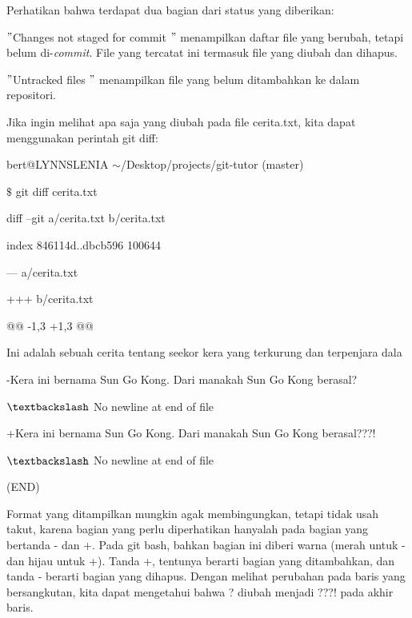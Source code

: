\vspace{12pt}
\noindent 
Perhatikan bahwa terdapat dua bagian dari status yang diberikan: \par
\noindent 
$ " $Changes not staged for commit $ " $ menampilkan daftar file yang berubah, tetapi belum di-\textit{commit}. File yang tercatat ini termasuk file yang diubah dan dihapus. \par
\noindent 
$ " $Untracked files $ " $ menampilkan file yang belum ditambahkan ke dalam repositori.
 \par
\noindent 
Jika ingin melihat apa saja yang diubah pada file {\fontsize{10pt}{10pt}\selectfont cerita.txt, kita dapat menggunakan perintah git diff:} \par
\noindent 
{\fontsize{10pt}{10pt}\selectfont bert@LYNNSLENIA  $  \sim  $/Desktop/projects/git-tutor (master)} \par
\noindent 
{\fontsize{10pt}{10pt}\selectfont  $  \$  $ git diff cerita.txt} \par
\noindent 
{\fontsize{10pt}{10pt}\selectfont diff --git a/cerita.txt b/cerita.txt} \par
\noindent 
{\fontsize{10pt}{10pt}\selectfont index 846114d..dbcb596 100644} \par
\noindent 
{\fontsize{10pt}{10pt}\selectfont --- a/cerita.txt} \par
\noindent 
{\fontsize{10pt}{10pt}\selectfont +++ b/cerita.txt} \par
\noindent 
{\fontsize{10pt}{10pt}\selectfont @@ -1,3 +1,3 @@} \par
\noindent 
{\fontsize{10pt}{10pt}\selectfont  Ini adalah sebuah cerita tentang seekor kera yang terkurung dan terpenjara dala} \par
\noindent 
\vspace{10pt}
\noindent 
{\fontsize{10pt}{10pt}\selectfont -Kera ini bernama Sun Go Kong. Dari manakah Sun Go Kong berasal?} \par
\noindent 
{\fontsize{10pt}{10pt}\selectfont  $  \textbackslash  $ No newline at end of file} \par
\noindent 
{\fontsize{10pt}{10pt}\selectfont +Kera ini bernama Sun Go Kong. Dari manakah Sun Go Kong berasal???!} \par
\noindent 
{\fontsize{10pt}{10pt}\selectfont  $  \textbackslash  $ No newline at end of file} \par
\noindent 
{\fontsize{10pt}{10pt}\selectfont (END)} \par
Format yang ditampilkan mungkin agak membingungkan, tetapi tidak usah takut, karena bagian yang perlu diperhatikan hanyalah pada bagian yang bertanda - dan +. Pada git bash, bahkan bagian ini diberi warna (merah untuk - dan hijau untuk +). Tanda +, tentunya berarti bagian yang ditambahkan, dan tanda - berarti bagian yang dihapus. Dengan melihat perubahan pada baris yang bersangkutan, kita dapat mengetahui bahwa ? diubah menjadi ???! pada akhir baris. \par
